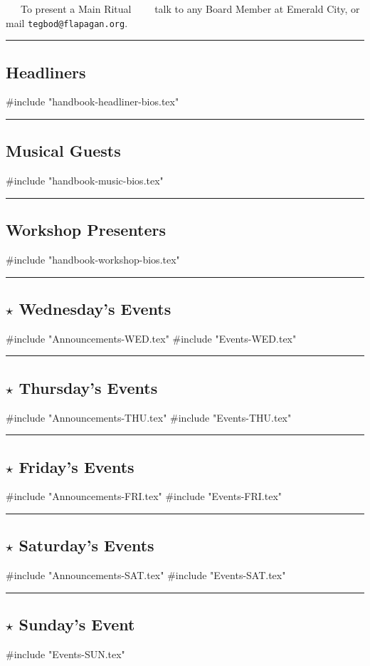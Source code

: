 \documentclass[9pt,twoside,openright,final,article]{memoir}
\let\oldsection=\section
\renewcommand{\section}[1]{%
  \vspace{3pt}%
  \needspace{1in}%
  { \hrule } \nopagebreak %
  \begin{center}\oldsection{#1}\end{center}\nopagebreak{}}
\renewcommand{\subsubsection}[1]{%
  \vspace{1pt}\needspace{1.5in}
  {\large ~~~\beltanefamily #1~~~\ }
  \nopagebreak}
\begin{document}
\begin{multicols}{2}
  \subsubsection{To present a Main Ritual} talk to any Board Member
  at Emerald City, or mail \texttt{tegbod@flapagan.org}.

  \section{Headliners}

  #include "handbook-headliner-bios.tex"

  \section{Musical Guests}

  #include "handbook-music-bios.tex"

  \section{Workshop Presenters}

  #include "handbook-workshop-bios.tex"

  \section{{\Large $\star$} Wednesday's Events}

  #include "Announcements-WED.tex"
  #include "Events-WED.tex"

  \section{{\Large $\star$} Thursday's Events}

  #include "Announcements-THU.tex"
  #include "Events-THU.tex"

  \section{{\Large $\star$} Friday's Events}

  #include "Announcements-FRI.tex"
  #include "Events-FRI.tex"

  \section{{\Large $\star$} Saturday's Events}

  #include "Announcements-SAT.tex"
  #include "Events-SAT.tex"

  \section{{\Large $\star$} Sunday's Event}
  #include "Events-SUN.tex"


\end{multicols}
\end{document}
